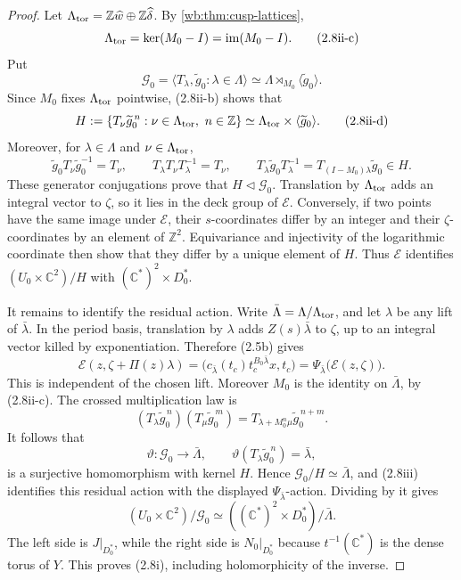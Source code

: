 \begin{proof}
Let
\(\Lambda_{\rm tor}=\mathbb Z\widehat w\oplus
\mathbb Z\widehat\delta\).  By \cref{wb:thm:cusp-lattices},
\[
 \Lambda_{\rm tor}=\ker(M_0-I)=\operatorname{im}(M_0-I).
\tag{2.8ii-c}
\]
Put
\[
 \mathcal G_0=\langle T_\lambda,\widetilde g_0:\lambda\in\Lambda\rangle
 \simeq\Lambda\rtimes_{M_0}\langle\widetilde g_0\rangle.
\]
Since \(M_0\) fixes \(\Lambda_{\rm tor}\) pointwise, (2.8ii-b) shows that
\[
 H:=\{T_\nu\widetilde g_0^{\,n}:
          \nu\in\Lambda_{\rm tor},\ n\in\mathbb Z\}
 \simeq\Lambda_{\rm tor}\times\langle\widetilde g_0\rangle.
\tag{2.8ii-d}
\]
Moreover, for \(\lambda\in\Lambda\) and
\(\nu\in\Lambda_{\rm tor}\),
\[
 \widetilde g_0T_\nu\widetilde g_0^{-1}=T_\nu,
 \qquad
 T_\lambda T_\nu T_\lambda^{-1}=T_\nu,
 \qquad
 T_\lambda\widetilde g_0T_\lambda^{-1}
 =T_{(I-M_0)\lambda}\widetilde g_0\in H.
\tag{2.8ii-e}
\]
These generator conjugations prove that \(H\triangleleft\mathcal G_0\).
Translation by \(\Lambda_{\rm tor}\) adds an integral vector to \(\zeta\),
so it lies in the deck group of \(\mathcal E\).
Conversely, if two points have the same image under \(\mathcal E\), their
\(s\)-coordinates differ by an integer and their \(\zeta\)-coordinates by
an element of \(\mathbb Z^2\).  Equivariance and injectivity of the
logarithmic coordinate then show that they differ by a unique element of \(H\).
Thus \(\mathcal E\) identifies
\((U_0\times\mathbb C^2)/H\) with
\((\mathbb C^*)^2\times D_0^*\).

It remains to identify the residual action.  Write
\(\bar\Lambda=\Lambda/\Lambda_{\rm tor}\), and let \(\lambda\) be any lift
of \(\bar\lambda\).  In the period basis, translation by \(\lambda\) adds
\(Z(s)\bar\lambda\) to \(\zeta\), up to an integral vector killed by
exponentiation.  Therefore (2.5b) gives
\[
 \mathcal E(z,\zeta+\Pi(z)\lambda)
 =\bigl(c_{\bar\lambda}(t_c)t_c^{B_0\bar\lambda}x,t_c\bigr)
 =\Psi_{\bar\lambda}\bigl(\mathcal E(z,\zeta)\bigr).
\tag{2.8iii}
\]
This is independent of the chosen lift.  Moreover \(M_0\) is the identity
on \(\bar\Lambda\), by (2.8ii-c).  The crossed multiplication law is
\[
 (T_\lambda\widetilde g_0^{\,n})
 (T_\mu\widetilde g_0^{\,m})
 =T_{\lambda+M_0^n\mu}\widetilde g_0^{\,n+m}.
\]
It follows that
\[
 \vartheta:\mathcal G_0\longrightarrow\bar\Lambda,
 \qquad
 \vartheta(T_\lambda\widetilde g_0^{\,n})=\bar\lambda,
\]
is a surjective homomorphism with kernel \(H\).  Hence
\(\mathcal G_0/H\simeq\bar\Lambda\), and (2.8iii) identifies this residual
action with the displayed \(\Psi_{\bar\lambda}\)-action.  Dividing by it
gives
\[
 (U_0\times\mathbb C^2)/\mathcal G_0
 \simeq
 ((\mathbb C^*)^2\times D_0^*)/\bar\Lambda.
\]
The left side is \(J|_{D_0^*}\), while the right side is
\(N_0|_{D_0^*}\) because \(t^{-1}(\mathbb C^*)\) is the dense torus of
\(Y\).  This proves (2.8i), including holomorphicity of the inverse.
\end{proof}


